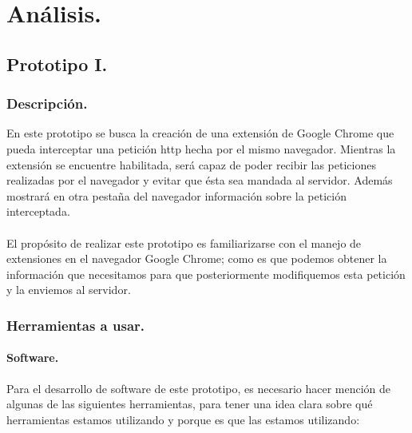 \documentclass[12pt, a4paper, titlepage]{article}
\begin{document}
	\newpage
	
	\section{\textcolor{azulescom}{Análisis.}}
	    
	    
		\subsection{Prototipo I.}
			\subsubsection{Descripción.}
				En este prototipo se busca la creación de una extensión de Google Chrome que pueda interceptar una petición \acrshort{http} hecha por el mismo navegador. Mientras la extensión se encuentre habilitada, será capaz de poder recibir las peticiones realizadas por el navegador y evitar que ésta sea mandada al servidor. Además mostrará en otra pestaña del navegador información sobre la petición interceptada. \\\\
				El propósito de realizar este prototipo es familiarizarse con el manejo de extensiones en el navegador Google Chrome; como es que podemos obtener la información que necesitamos para que posteriormente modifiquemos esta petición y la enviemos al servidor. 
			
			\subsubsection{Herramientas a usar.}
				\paragraph{Software. \\}
				Para el desarrollo de software de este prototipo, es necesario hacer mención de algunas de las siguientes herramientas, para tener una idea clara sobre qué herramientas estamos utilizando y porque es que las estamos utilizando:
				
\end{document}
